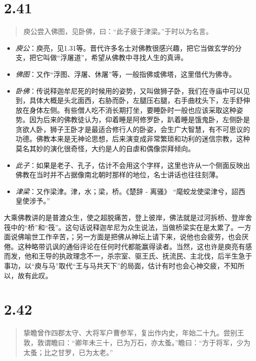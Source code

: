 \documentclass[]{book}
\providecommand{\tightlist}{%
  \setlength{\itemsep}{0pt}\setlength{\parskip}{0pt}}
\begin{document}
\section{2.41}\label{section-87}

\begin{quote}
庾公尝入佛图，见卧佛，曰：``此子疲于津梁。''于时以为名言。
\end{quote}

\begin{itemize}
\tightlist
\item
  \emph{庾公}：庾亮，见1.31等。晋代许多名士对佛教很感兴趣，把它当做玄学的分支，把它叫做``浮屠道''，希望从佛教中寻找人生的真谛。
\item
  \emph{佛图}：又作``浮图、浮屠、休屠''等，一般指佛或佛塔，这里借代为佛寺。
\item
  \emph{卧佛}：传说释迦牟尼死的时候用的姿势，又叫做狮子卧，我们在寺庙中可以见到，具体大概是头北面西，右胁而卧，左腿压右腿，右手曲枕头下，左手舒伸放在身体左侧。有些僧人吃不消长期打坐，要睡卧时一般也应该采取这种姿势。因为后来的佛教徒认为，仰着睡是阿修罗卧，趴着睡是饿鬼卧，左侧卧是贪欲人卧，狮子王卧才是最适合修行人的卧姿，会生广大智慧，有不可思议的功德。佛教本来是无神论思想，后来演变成非常繁琐和功利的迷信宗教，这种莫名其妙的演化很奇怪，大约是人的自虐和偶像崇拜倾向。
\item
  \emph{此子}：如果是老子、孔子，估计不会用这个字样，这里也许从一个侧面反映出佛教在当时并不占据像南北朝时那样的地位，名士讲话也往往刻薄。
\item
  \emph{津梁}：又作梁津。津，水；梁，桥。《楚辞 - 离骚》
  ``麾蛟龙使梁津兮，詔西皇使涉予。''
\end{itemize}

大乘佛教讲的是普渡众生，使之超脱痛苦，登上彼岸，佛法就是过河拆桥、登岸舍筏中的``桥''和``筏''。这句话说释迦牟尼为众生说法，当做桥梁实在是太累了。一方面说佛喻世工作辛苦，；另一方面是把佛从神坛上请下来，说他也会疲劳，也会厌倦。这种略带讥讽的通俗评论在任何时代都能赢得读者。当然，这也许是庾亮有感而发，他和王导的执政理念不一，杀宗室、驱王氏、抚流民、主北伐，后半生急于事功，以``庾与马''取代``王与马共天下''的局面，估计有时也会心神交疲，不知所以，故有此叹。

\section{2.42}\label{section-88}

\begin{quote}
挚瞻曾作四郡太守、大将军户曹参军，复出作内史，年始二十九。尝别王敦，敦谓瞻曰：``卿年未三十，已为万石，亦太蚤。''瞻曰：``方于将军，少为太蚤；比之甘罗，已为太老。''
\end{quote}
\end{document}
